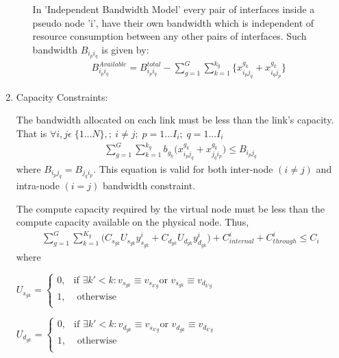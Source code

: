\documentclass[article,dr=phil,type=msc ,colorback,accentcolor=tud4b]{tudthesis}
\begin{document}
\begin{enumerate}[label=(\Alph*)]
\begin{enumerate}
In 'Independent Bandwidth Model' every pair of interfaces inside a pseudo node 'i', have their own bandwidth which is independent of resource consumption between any other pairs of interfaces. Such bandwidth $B_{i_{p}i_{q}}$ is given by:
\begin{equation} 
\begin{split}
B^{Available}_{i_{p}i_{q}} = B^{total}_{i_{p}i_{q}} -  \sum_{g=1}^{G} \sum_{k=1}^{k_{g}} \{ x_{i_{p}j_{q}}^{g_{k}} + x_{i_{q}j_{p}}^{g_{k}}\}
\end{split}
\end{equation}
\end{enumerate}
\item  Capacity Constraints: 

The bandwidth allocated on each link must be less than the link's capacity. That is $\forall i, j\epsilon \; \{1...N\}, ;\ i \neq j; \; p = 1...I_{i}; \; q = 1...I_{i}$
\begin{equation} \label{bw_cons}
\begin{split}
 \sum_{g=1}^{G} \sum_{k=1}^{k_{g}} b_{g_{k}} \big(x_{i_{p}j_{q}}^{g_{k}} + x_{j_{q}i_{p}}^{g_{k}}\big) \leq B_{i_{p}j_{q}}
\end{split}
\end{equation} 
where $B_{i_{p}j_{q}} = B_{j_{q}i_{p}}$. This equation is valid for both inter-node $(i\neq j)$ and intra-node  $(i= j)$ bandwidth constraint.\newline

The compute capacity required by the virtual node must be less than the compute capacity available on the physical node. Thus,
\begin{equation} \label{cpu_cons}
\begin{split}
\sum_{g=1}^{G} \sum_{k=1}^{K_{g}} \big( C_{s_{gk}} U_{s_{gk}}  y^{i}_{s_{gk}} +  C_{d_{gk}} U_{d_{gk}} y^{i}_{d_{gk}} \big) + C_{internal}^{i} + C_{through}^{i} \leq C_{i} 
\end{split}
\end{equation} 
where \newline

$U_{s_{gk}} = \begin{cases}
0, & \text{if }  \exists k' < k: v_{s_{gk}} \equiv v_{s_{k'g}} \text{or } v_{s_{gk}} \equiv v_{d_{k'g}} \\
1, & \text{ otherwise} \\
\end{cases}$	
		
$U_{d_{gk}} = \begin{cases}
0, & \text{if }  \exists k' < k: v_{d_{gk}} \equiv v_{s_{k'g}} \text{or } v_{d_{gk}} \equiv v_{d_{k'g}} \\
1, & \text{ otherwise} \\
\end{cases}$	



\end{enumerate}
\end{document}
